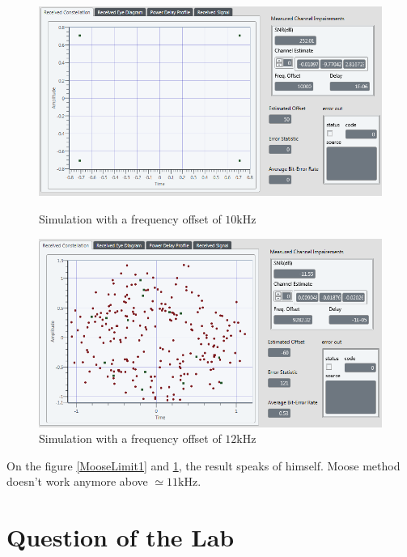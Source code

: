 \documentclass[frenchb, oneside, headings=normal]{scrartcl}
\begin{document}
\begin{figure}[!ht]
    \begin{minipage}[b]{0.48\linewidth}
        \centering \includegraphics[scale=0.45]{img/test_Offset_10k_OK_limitMooseCheck.png}
     \caption{Simulation with a frequency offset of $10 \si{\kilo\hertz}$}
     \label{MooseLimit1}
    \end{minipage}\hfill
    \begin{minipage}[b]{0.48\linewidth}
         \centering \includegraphics[scale=0.45]{img/test_Offset_12k_OK_limitMooseCheck.png}
\caption{Simulation with a frequency offset of $12 \si{\kilo\hertz}$}
 \label{MooseLimit2}
    \end{minipage}
\end{figure}

On the figure \ref{MooseLimit1} and \ref{MooseLimit2}, the result speaks of himself. Moose method doesn't work anymore above $\simeq 11 \si{\kilo\hertz}$.

\section{Question of the Lab}
\end{document}
